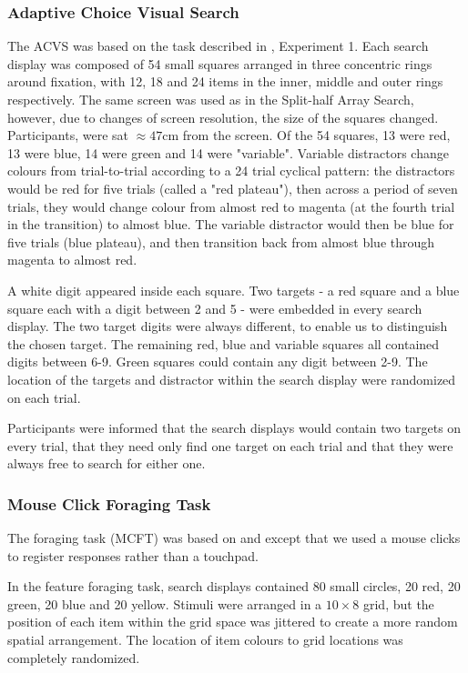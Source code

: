 \documentclass[]{rsos}%
\begin{document}
\subsubsection{Adaptive Choice Visual Search}

The ACVS was based on the task described in \cite{irons-leber2016}, Experiment 1. Each search display was composed of 54 small squares arranged in three concentric rings around fixation, with 12, 18 and 24 items in the inner, middle and outer rings respectively. The same screen was used as in the Split-half Array Search, however, due to changes of screen resolution, the size of the squares changed. Participants, were sat $\approx 47$cm from the screen. Of the 54 squares, 13 were red, 13 were blue, 14 were green and 14 were "variable". Variable distractors change colours from trial-to-trial according to a 24 trial cyclical pattern: the distractors would be red for five trials (called a "red plateau"), then across a period of seven trials, they would change colour from almost red to magenta (at the fourth trial in the transition) to almost blue. The variable distractor would then be blue for five trials (blue plateau), and then transition back from almost blue through magenta to almost red. 

A white digit appeared inside each square. Two targets - a red square and a blue square each with a digit between 2 and 5 - were embedded in every search display. The two target digits were always different, to enable us to distinguish the chosen target. The remaining red, blue and variable squares all contained digits between 6-9. Green squares could contain any digit between 2-9. The location of the targets and distractor within the search display were randomized on each trial.

Participants were informed that the search displays would contain two targets on every trial, that they need only find one target on each trial and that they were always free to search for either one.   

\subsubsection{Mouse Click Foraging Task}

The foraging task (MCFT) was based on \cite{kristjansson2014} and \cite{johannesson2016} except that we used a mouse clicks to register responses rather than a touchpad. 

In the feature foraging task, search displays contained 80 small circles, 20 red, 20 green, 20 blue  and 20 yellow. Stimuli were arranged in a $10 \times 8$ grid, but the position of each item within the grid space was jittered to create a more random spatial arrangement. The location of item colours to grid locations was completely randomized. 
\end{document}
